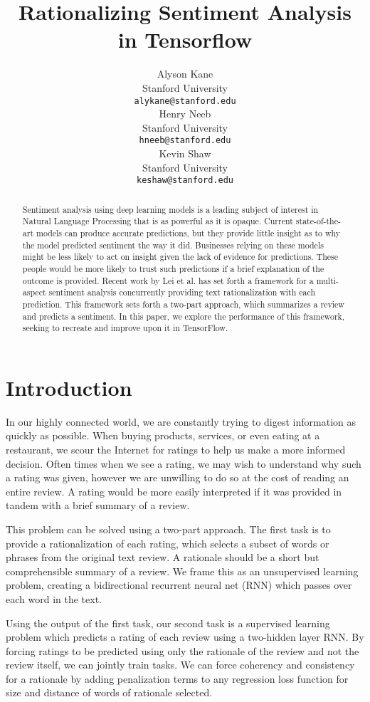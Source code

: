 \documentclass{article} %
\title{Rationalizing Sentiment Analysis in Tensorflow}
\author{
Alyson Kane \\
Stanford University\\
\texttt{alykane@stanford.edu} \\
\And
Henry Neeb \\
Stanford University\\
\texttt{hneeb@stanford.edu}\\
\And
Kevin Shaw \\
Stanford University\\
\texttt{keshaw@stanford.edu}\\
}
\begin{document}
\maketitle

\begin{abstract}

Sentiment analysis using deep learning models is a leading subject of interest
in Natural Language Processing that is as powerful as it is opaque. Current
state-of-the-art models can produce accurate predictions, but they provide
little insight as to why the model predicted sentiment the way it did.
Businesses relying on these models might be less likely to act on insight given
the lack of evidence for predictions. These people would be more likely to trust
such predictions if a brief explanation of the outcome is provided. Recent work
by Lei et al. has set forth a framework for a multi-aspect sentiment analysis
concurrently providing text rationalization with each prediction. This framework
sets forth a two-part approach, which summarizes a review and predicts a
sentiment. In this paper, we explore the performance of this framework, seeking
to recreate and improve upon it in TensorFlow.

\end{abstract}

\section{Introduction}

In our highly connected world, we are constantly trying to digest information as
quickly as possible. When buying products, services, or even eating at a
restaurant, we scour the Internet for ratings to help us make a more informed
decision. Often times when we see a rating, we may wish to understand why such a
rating was given, however we are unwilling to do so at the cost of reading an
entire review. A rating would be more easily interpreted if it was provided in
tandem with a brief summary of a review.

This problem can be solved using a two-part approach. The first task is to
provide a rationalization of each rating, which selects a subset of words or
phrases from the original text review. A rationale should be a short but
comprehensible summary of a review. We frame this as an unsupervised learning
problem, creating a bidirectional recurrent neural net (RNN) which passes over
each word in the text.

Using the output of the first task, our second task is a supervised learning
problem which predicts a rating of each review using a two-hidden layer RNN. By
forcing ratings to be predicted using only the rationale of the review and not
the review itself, we can jointly train tasks. We can force coherency and
consistency for a rationale by adding penalization terms to any regression loss
function for size and distance of words of rationale selected.
\end{document}
